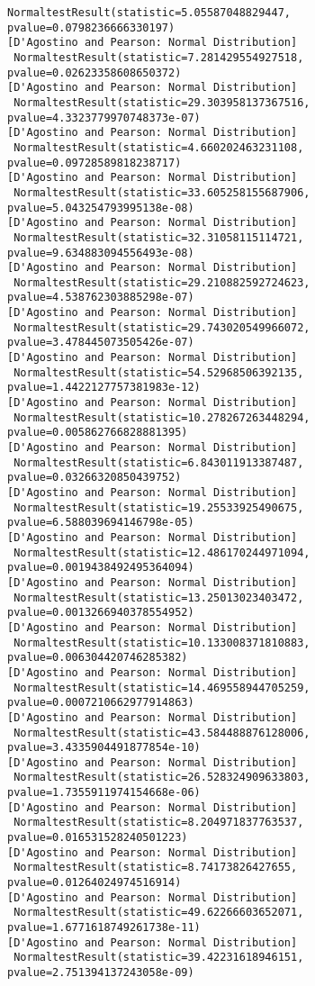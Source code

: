 \documentclass[11pt]{article}
\begin{document}
\begin{Verbatim}[commandchars=\\\{\}]
 NormaltestResult(statistic=5.05587048829447, pvalue=0.0798236666330197)
[D'Agostino and Pearson: Normal Distribution]
 NormaltestResult(statistic=7.281429554927518, pvalue=0.02623358608650372)
[D'Agostino and Pearson: Normal Distribution]
 NormaltestResult(statistic=29.303958137367516, pvalue=4.3323779970748373e-07)
[D'Agostino and Pearson: Normal Distribution]
 NormaltestResult(statistic=4.660202463231108, pvalue=0.09728589818238717)
[D'Agostino and Pearson: Normal Distribution]
 NormaltestResult(statistic=33.605258155687906, pvalue=5.043254793995138e-08)
[D'Agostino and Pearson: Normal Distribution]
 NormaltestResult(statistic=32.31058115114721, pvalue=9.634883094556493e-08)
[D'Agostino and Pearson: Normal Distribution]
 NormaltestResult(statistic=29.210882592724623, pvalue=4.538762303885298e-07)
[D'Agostino and Pearson: Normal Distribution]
 NormaltestResult(statistic=29.743020549966072, pvalue=3.478445073505426e-07)
[D'Agostino and Pearson: Normal Distribution]
 NormaltestResult(statistic=54.52968506392135, pvalue=1.4422127757381983e-12)
[D'Agostino and Pearson: Normal Distribution]
 NormaltestResult(statistic=10.278267263448294, pvalue=0.005862766828881395)
[D'Agostino and Pearson: Normal Distribution]
 NormaltestResult(statistic=6.843011913387487, pvalue=0.03266320850439752)
[D'Agostino and Pearson: Normal Distribution]
 NormaltestResult(statistic=19.25533925490675, pvalue=6.588039694146798e-05)
[D'Agostino and Pearson: Normal Distribution]
 NormaltestResult(statistic=12.486170244971094, pvalue=0.0019438492495364094)
[D'Agostino and Pearson: Normal Distribution]
 NormaltestResult(statistic=13.25013023403472, pvalue=0.0013266940378554952)
[D'Agostino and Pearson: Normal Distribution]
 NormaltestResult(statistic=10.133008371810883, pvalue=0.006304420746285382)
[D'Agostino and Pearson: Normal Distribution]
 NormaltestResult(statistic=14.469558944705259, pvalue=0.0007210662977914863)
[D'Agostino and Pearson: Normal Distribution]
 NormaltestResult(statistic=43.584488876128006, pvalue=3.4335904491877854e-10)
[D'Agostino and Pearson: Normal Distribution]
 NormaltestResult(statistic=26.528324909633803, pvalue=1.7355911974154668e-06)
[D'Agostino and Pearson: Normal Distribution]
 NormaltestResult(statistic=8.204971837763537, pvalue=0.016531528240501223)
[D'Agostino and Pearson: Normal Distribution]
 NormaltestResult(statistic=8.74173826427655, pvalue=0.01264024974516914)
[D'Agostino and Pearson: Normal Distribution]
 NormaltestResult(statistic=49.62266603652071, pvalue=1.6771618749261738e-11)
[D'Agostino and Pearson: Normal Distribution]
 NormaltestResult(statistic=39.42231618946151, pvalue=2.751394137243058e-09)

\end{Verbatim}
\end{document}
